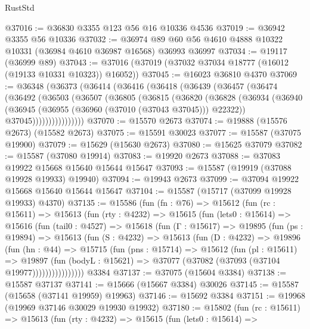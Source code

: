 \begin{lexlean}{RustStd}
\begin{coremodule}
@37016 := @36830 @3355 @123 @56 @16 @10336 @4536
@37019 := @36942 @3355 @56 @10336
@37032 := @36974 @89 @60 @56 @4610 @4888 @10322 @10331 (@36984 @4610 @36987 @16568) @36993 @36997
@37034 := @19117 (@36999 @89)
@37043 := @37016 (@37019 (@37032 @37034 @18777 (@16012 (@19133 @10331 @10323)) @16052))
@37045 := @16023 @36810 @4370
@37069 := @36348
    (@36373
      (@36414
        (@36416
          (@36418
            (@36439
              (@36457
                (@36474
                  (@36492
                    (@36503
                      (@36507
                        (@36805
                          (@36815
                            (@36820
                              (@36828
                                (@36934
                                  (@36940
                                    (@36945 (@36955 (@36960 (@37010 (@37043 @37045))) @22322))
                                    @37045))))))))))))))))
@37070 := @15570 @2673
@37074 := @19888 (@15576 @2673) (@15582 @2673)
@37075 := @15591 @30023
@37077 := @15587 (@37075 @19900)
@37079 := @15629 (@15630 @2673)
@37080 := @15625 @37079
@37082 := @15587 (@37080 @19914)
@37083 := @19920 @2673
@37088 := @37083 @19922 @15668 @15640 @15644 @15647
@37093 := @15587 (@19919 (@37088 @19928 @19933) @19940)
@37094 := @19943 @2673
@37099 := @37094 @19922 @15668 @15640 @15644 @15647
@37104 := @15587 (@15717 (@37099 @19928 @19933) @4370)
@37135 := @15586
    (fun (fn : @76) =>
    @15612
      (fun (rc : @15611) =>
      @15613
        (fun (rty : @4232) =>
        @15615
          (fun (lets0 : @15614) =>
          @15616
            (fun (tail0 : @4527) =>
            @15618
              (fun (Γ : @15617) =>
              @19895
                (fun (ps : @19894) =>
                @15613
                  (fun (S : @4232) =>
                  @15613
                    (fun (D : @4232) =>
                    @19896
                      (fun (hn : @44) =>
                      @15715
                        (fun (pns : @15714) =>
                        @15612
                          (fun (pl : @15611) =>
                          @19897
                            (fun (bodyL : @15621) =>
                            @37077 (@37082 (@37093 (@37104 @19977))))))))))))))))
    @3384
@37137 := @37075 (@15604 @3384)
@37138 := @15587 @37137
@37141 := @15666 (@15667 @3384) @30026
@37145 := @15587 (@15658 (@37141 @19959) @19963)
@37146 := @15692 @3384
@37151 := @19968 (@19969 @37146 @30029 @19930 @19932)
@37180 := @15802
    (fun (rc : @15611) =>
    @15613
      (fun (rty : @4232) =>
      @15615
        (fun (lets0 : @15614) =>

\end{coremodule}
\end{lexlean}
